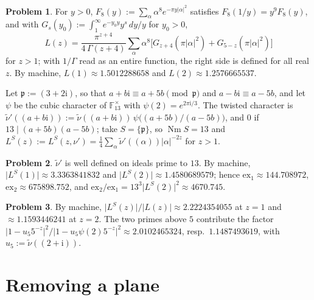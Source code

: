 \documentclass[reqno]{amsart}
\theoremstyle{definition}
\newtheorem{problem}{Problem}[section]
\theoremstyle{plain}
\newcommand{\F}{\mathbb F}
\newcommand{\Nm}{\operatorname{Nm}}
\newcommand{\ex}{\mathrm{ex}}
\newcommand{\ii}{\mathrm{i}}
\begin{document}
\begin{problem}\label{pr:Lgauss}
For \(y > 0\), \(F_8(y) := \sum_\alpha \alpha^8 e^{-\pi y\lvert\alpha\rvert^2}\) satisfies \(F_8(1/y) = y^9F_8(y)\), and with \(G_s(y_0) := \int_1^\infty e^{-y_0y}y^s\,dy/y\) for \(y_0 > 0\),
\[
  L(z) = \frac{\pi^{z+4}}{4\,\Gamma(z+4)}\sum_\alpha \alpha^8\bigl[G_{z+4}(\pi\lvert\alpha\rvert^2) + G_{5-z}(\pi\lvert\alpha\rvert^2)\bigr]
\]
for \(z > 1\); with \(1/\Gamma\) read as an entire function, the right side is defined for all real \(z\).  By machine, \(L(1) \approx 1.5012288658\) and \(L(2) \approx 1.2576665537\).
\end{problem}

Let \(\mathfrak p := (3 + 2\ii)\), so that \(a + b\ii \equiv a + 5b \pmod{\mathfrak p}\) and \(a - b\ii \equiv a - 5b\), and let \(\psi\) be the cubic character of \(\F_{13}^\times\) with \(\psi(2) = e^{2\pi\ii/3}\).  The twisted character is \(\tilde\nu'((a + b\ii)) := \tilde\nu((a+b\ii))\,\psi\bigl((a+5b)/(a-5b)\bigr)\), and \(0\) if \(13 \mid (a+5b)(a-5b)\); take \(S = \{\mathfrak p\}\), so \(\Nm S = 13\) and \(L^S(z) := L^S(z,\nu') = \frac14\sum_\alpha\tilde\nu'((\alpha))\lvert\alpha\rvert^{-2z}\) for \(z > 1\).

\begin{problem}\label{pr:Ltwist}
\(\tilde\nu'\) is well defined on ideals prime to \(13\).  By machine, \(\lvert L^S(1)\rvert \approx 3.3363841832\) and \(\lvert L^S(2)\rvert \approx 1.4580689579\); hence \(\ex_1 \approx 144.708972\), \(\ex_2 \approx 675898.752\), and \(\ex_2/\ex_1 = 13^3\lvert L^S(2)\rvert^2 \approx 4670.745\).
\end{problem}

\begin{problem}\label{pr:ratios}
By machine, \(\lvert L^S(z)\rvert/\lvert L(z)\rvert \approx 2.2224354055\) at \(z = 1\) and \(\approx 1.1593446241\) at \(z = 2\).  The two primes above \(5\) contribute the factor \(\lvert 1 - u_5 5^{-z}\rvert^2/\lvert 1 - u_5\psi(2)5^{-z}\rvert^2 \approx 2.0102465324\), resp.\ \(1.1487493619\), with \(u_5 := \tilde\nu((2+\ii))\).
\end{problem}

\section{Removing a plane}\label{sec:plane}
\end{document}
